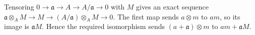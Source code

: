 Tensoring $0\to\mathfrak{a}\to A\to A/\mathfrak{a}\to0$ with $M$ gives an exact sequence $\mathfrak{a}\otimes_A M\to M\to(A/\mathfrak{a})\otimes_A M\to0$. The first map sends $a\otimes m$ to $am$, so its image is $\mathfrak{a}M$. Hence the required isomorphism sends $(a+\mathfrak{a})\otimes m$ to $am+\mathfrak{a}M$.
